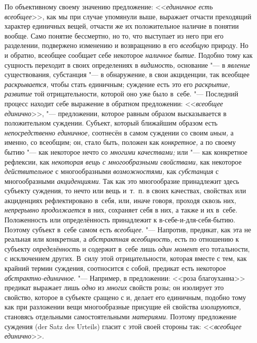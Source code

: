 По объективному своему значению предложение: <<{\em единичное есть всеобщее}>>,
как мы при случае упомянули выше, выражает отчасти преходящий характер
единичных вещей, отчасти же их положительное наличие в понятии вообще. Само
понятие бессмертно, но то, что выступает из него при его разделении, подвержено
изменению и возвращению в его {\em всеобщую} природу. Но и обратно, всеобщее
сообщает себе некоторое {\em наличное бытие}. Подобно тому как сущность
переходит в своих определениях в {\em видимость,} основание "---
в {\em явление} существования, субстанция "--- в обнаружение, в свои
акциденции, так всеобщее {\em раскрывается,} чтобы стать единичным; суждение
есть это его {\em раскрытие, развитие} той отрицательности, которой оно
уже было в~себе. "--- Последний процесс находит себе выражение в обратном
предложении: <<{\em всеобщее единично}>>, "--- предложении, которое равным
образом высказывается в положительном суждении. Субъект, который ближайшим
образом есть {\em непосредственно единичное,} соотнесён в самом суждении со
своим {\em иным,} а именно, со всеобщим; он, стало быть, положен как
{\em конкретное,} а по своему бытию "--- как некоторое нечто со
{\em многими качествами;} или "--- как конкретное рефлексии, как {\em некоторая
вещь с многообразными свойствами,} как некоторое {\em действительное}
с многообразными {\em возможностями,} как {\em субстанция} с многообразными
{\em акциденциями}. Так как это многообразие принадлежит здесь субъекту
суждения, то нечто или вещь и~т.~п. в своих качествах, свойствах или
акциденциях рефлектировано в~себя, или, иначе говоря, проходя сквозь них,
{\em непрерывно продолжается} в них, сохраняет себя в них, а также и их в~себе.
Положенность или определённость принадлежит к в-себе-и-для-себя-бытию. Поэтому
субъект в~себе самом есть {\em всеобщее}. "--- Напротив, предикат, как эта не
реальная или конкретная, а {\em абстрактная всеобщность,} есть по отношению к
субъекту {\em определённость} и содержит в~себе лишь {\em один момент} его
тотальности, с исключением других. В~силу этой отрицательности, которая вместе
с тем, как крайний термин суждения, соотносится с собой, предикат есть
некоторое {\em абстрактно-единичное}. "--- Например, в предложении: <<роза
благоуханна>> предикат выражает лишь {\em одно} из {\em многих} свойств розы;
он изолирует это свойство, которое в субъекте сращено с и, делает его
единичным, подобно тому как при разложении вещи многообразные присущие ей
свойства {\em изолируются,} становясь отдельными самостоятельными
{\em материями}. Поэтому предложение суждения (der Satz des
Urteils) гласит с этой своей стороны так: <<{\em всеобщее единично}>>.

